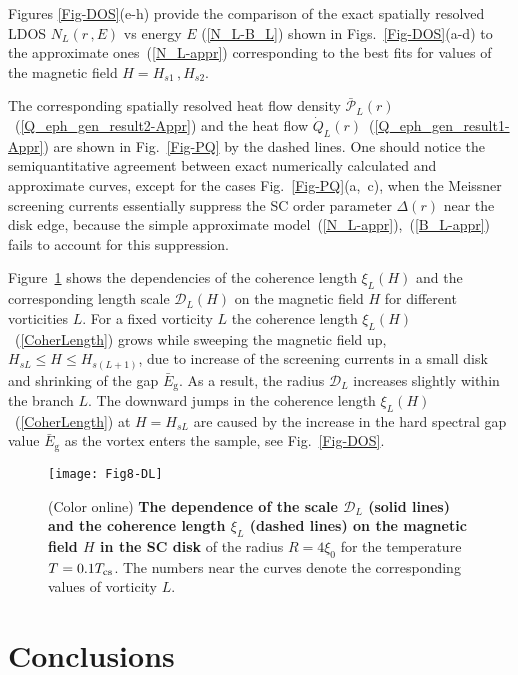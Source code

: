 \documentclass[prx,twocolumn,aps,superscriptaddress,showpacs,amsmath,amssymb,footnoteinbib]{revtex4-1}
\begin{document}
Figures \ref{Fig-DOS}(e-h) provide the comparison of the exact
spatially resolved LDOS $N_L(r\,,E)$ vs energy $E$ (\ref{N_L-B_L})
shown in Figs.~\ref{Fig-DOS}(a-d) to the approximate
ones~(\ref{N_L-appr}) corresponding to the best fits for values of
the magnetic field $H = H_{s1}\,,H_{s2}$.

The corresponding spatially resolved heat flow density $\bar{\mathcal{P}}_L(r)$~(\ref{Q_eph_gen_result2-Appr})
and the heat flow $\dot{Q}_L(r)$~(\ref{Q_eph_gen_result1-Appr}) are shown in Fig.~\ref{Fig-PQ} by
the dashed lines.
One should notice the semiquantitative agreement between exact numerically calculated and
approximate curves, except for the cases Fig.~\ref{Fig-PQ}(a,~c), when the Meissner screening currents
essentially suppress the SC order parameter $\Delta(r)$ near the
disk edge, because the simple approximate model~(\ref{N_L-appr}),~(\ref{B_L-appr}) fails to account for this
suppression.

Figure~\ref{Fig8-R(H)} shows the dependencies of
the coherence length $\xi_L(H)$ and the corresponding length scale $\mathcal{D}_L(H)$
on the magnetic field $H$ for different vorticities $L$. For a
fixed vorticity $L$ the coherence length $\xi_L(H)$~(\ref{CoherLength}) grows while sweeping the magnetic field up,
$H_{sL} \le H \le H_{s(L+1)}$, due to increase of the screening
currents in a small disk and shrinking of the gap
$\bar{E}_\mathrm{g}$. As a result, the radius $\mathcal{D}_{L}$
increases slightly within the branch $L$. The downward jumps in
the coherence length $\xi_L(H)$~(\ref{CoherLength}) at $H =
H_{sL}$ are caused by the increase in the hard spectral gap value
$\bar{E}_\mathrm{g}$ as the vortex enters the sample, see Fig.~\ref{Fig-DOS}. %
%
\begin{figure}[tb]
\texttt{[image: Fig8-DL]}
\caption{(Color online) \textbf{The dependence of the scale
$\mathcal{D}_L$ (solid lines) and the coherence length $\xi_L$
(dashed lines) on the magnetic field $H$ in the SC disk} of the
radius $R = 4 \xi_0$ for the temperature $T = 0.1 T_{\rm cs}$. The
numbers near the curves denote the corresponding values of
vorticity $L$.} \label{Fig8-R(H)}
\end{figure}

\section{Conclusions}\label{SumUpSection}
\end{document}

